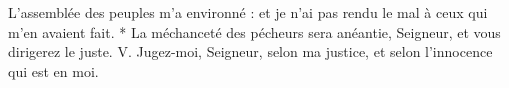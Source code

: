 L’assemblée des peuples m’a environné : et je n’ai pas rendu le mal à ceux qui m’en avaient fait.
\versseparator
* La méchanceté des pécheurs sera anéantie, Seigneur, et vous dirigerez le juste.
\versseparator
V. Jugez-moi, Seigneur, selon ma justice, et selon l’innocence qui est en moi.

